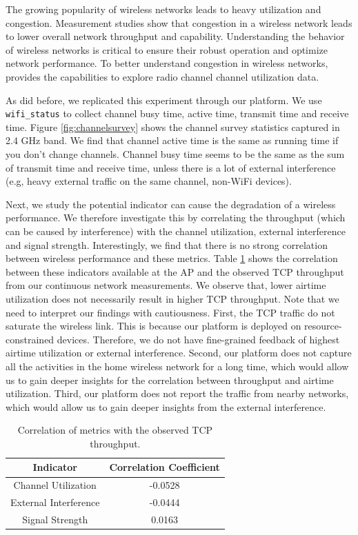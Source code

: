 The growing popularity of wireless networks leads to heavy utilization and congestion. Measurement studies show that congestion in a wireless network leads to lower overall network throughput and capability. Understanding the behavior of wireless networks is critical to ensure their robust operation and optimize network performance. To better understand congestion in wireless networks, \sysname provides the capabilities to explore radio channel channel utilization data. 

As \cite{channelsurvey} did before, we replicated this experiment through our \sysname platform. We use \texttt{wifi\_status} to collect channel busy time, active time, transmit time and receive time. Figure \ref{fig:channelsurvey} shows the channel survey statistics captured in 2.4 GHz band. We find that channel active time is the same as running time if you don't change channels. Channel busy time seems to be the same as the sum of transmit time and receive time, unless there is a lot of external interference (e.g, heavy external traffic on the same channel, non-WiFi devices).

Next, we study the potential indicator can cause the degradation of a wireless performance. We therefore investigate this by correlating the throughput (which can be caused by interference) with the channel utilization, external interference and signal strength. Interestingly, we find that there is no strong correlation between wireless performance and these metrics. Table \ref{table: Correlation} shows the correlation between these indicators available at the AP and the observed TCP throughput from our continuous network measurements. We observe that, lower airtime utilization does not necessarily result in higher TCP throughput. Note that we need to interpret our findings with cautiousness. First, the TCP traffic do not saturate the wireless link. This is because our platform is deployed on resource-constrained devices. Therefore, we do not have fine-grained feedback of highest airtime utilization or external interference. Second, our platform does not capture all the activities in the home wireless network for a long time, which would allow us to gain deeper insights for the correlation between throughput and airtime utilization. Third, our platform does not report the traffic from nearby networks, which would allow us to gain deeper insights from the external interference.

\begin{table}[]
\centering
\begin{tabular}{ |c|c| }
\hline
Indicator               & Correlation Coefficient  \\ 
\hline
Channel Utilization               &-0.0528  \\ 
\hline
External Interference & -0.0444 \\ 
\hline
Signal Strength & 0.0163 \\
\hline
\end{tabular}
\caption{Correlation of metrics with the observed TCP throughput.}
\label{table: Correlation}
\end{table}

